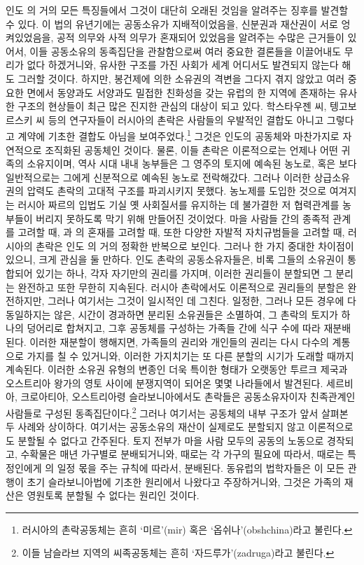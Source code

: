인도 의 거의 모든 특징들에서
그것이 대단히 오래된 것임을 알려주는 징후를 발견할 수 있다.
이 법의 유년기에는 공동소유가 지배적이었음을,
신분권과 재산권이 서로 엉켜있었음을,
공적 의무와 사적 의무가 혼재되어 있었음을 알려주는
수많은 근거들이 있어서,
이들 공동소유의 동족집단을 관찰함으로써 여러 중요한 결론들을
이끌어내도 무리가 없다 하겠거니와,
유사한 구조를 가진 사회가 세계 어디서도 발견되지 않는다 해도 그러할 것이다.
하지만,
봉건제에 의한 소유권의 격변을 그다지 겪지 않았고
여러 중요한 면에서 동양과도 서양과도 밀접한 친화성을 갖는
유럽의 한 지역에 존재하는 유사한 구조의 현상들이
최근 많은 진지한 관심의 대상이 되고 있다.
학스타우젠 씨,
텡고보르스키 씨 등의 연구자들이
러시아의 촌락은 사람들의 우발적인 결합도 아니고
그렇다고 계약에 기초한 결합도 아님을 보여주었다.\footnote{%
  러시아의 촌락공동체는 흔히 `미르'(mir) 혹은 `옵쉬나'(obshchina)라고 불린다. }
그것은 인도의 공동체와 마찬가지로 자연적으로 조직화된 공동체인 것이다.
물론,
이들 촌락은 이론적으로는 언제나 어떤 귀족의 소유지이며,
역사 시대 내내
농부들은
그 영주의 토지에 예속된 농노로,
혹은 보다 일반적으로는
그에게 신분적으로 예속된 농노로 전락해갔다.
그러나
이러한 상급소유권의 압력도
촌락의 고대적 구조를 파괴시키지 못했다.
농노제를 도입한 것으로 여겨지는 러시아 짜르의 입법도
기실 옛 사회질서를 유지하는 데 불가결한 저 협력관계를
농부들이 버리지 못하도록 막기 위해 만들어진 것이었다.
마을 사람들 간의 종족적 관계를 고려할 때,
과 의 혼재를 고려할 때,
또한 다양한 자발적 자치규범들을 고려할 때,
러시아의 촌락은 인도 의 거의 정확한 반복으로 보인다.
그러나 한 가지 중대한 차이점이 있으니,
크게 관심을 둘 만하다.
인도 촌락의 공동소유자들은,
비록 그들의 소유권이 통합되어 있기는 하나,
각자 자기만의 권리를 가지며,
이러한 권리들이 분할되면 그 분리는 완전하고 또한 무한히 지속된다.
러시아 촌락에서도 이론적으로 권리들의 분할은 완전하지만,
그러나 여기서는 그것이 일시적인 데 그친다.
일정한, 그러나 모든 경우에 다 동일하지는 않은,
시간이 경과하면
분리된 소유권들은 소멸하여,
그 촌락의 토지가 하나의 덩어리로 합쳐지고, 그후
공동체를 구성하는 가족들 간에 식구 수에 따라 재분배된다.
이러한 재분할이 행해지면,
가족들의 권리와 개인들의 권리는 다시
다수의 계통으로 가지를 칠 수 있거니와,
이러한 가지치기는 또 다른 분할의 시기가 도래할 때까지 계속된다.
이러한 소유권 유형의 변종인 더욱 특이한 형태가
오랫동안
투르크 제국과 오스트리아 왕가의 영토 사이에 분쟁지역이 되어온
몇몇 나라들에서 발견된다.
세르비아, 크로아티아, 오스트리아령 슬라보니아에서도
촌락들은 공동소유자이자 친족관계인 사람들로 구성된 동족집단이다.\footnote{%
  이들 남슬라브 지역의 씨족공동체는 흔히 `자드루가'(zadruga)라고 불린다. }
그러나 여기서는 공동체의 내부 구조가
앞서 살펴본 두 사례와 상이하다.
여기서는 공동소유의 재산이 실제로도 분할되지 않고
이론적으로도 분할될 수 없다고 간주된다.
토지 전부가 마을 사람 모두의 공동의 노동으로 경작되고,
수확물은 매년 가구별로 분배되거니와,
때로는 각 가구의 필요에 따라서,
때로는 특정인에게 의 일정 몫을 주는 규칙에 따라서,
분배된다.
동유럽의 법학자들은 이 모든 관행이
초기 슬라보니아법에 기초한 원리에서 나왔다고 주장하거니와,
그것은 가족의 재산은 영원토록 분할될 수 없다는 원리인 것이다.


